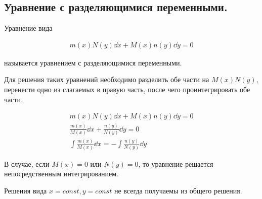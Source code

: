 \subsection{%
  Уравнение с разделяющимися переменными.%
}

\begin{definition}
  Уравнение вида

  \begin{align*}
    m(x) N(y) \dd x + M(x) n(y) \dd y = 0
  \end{align*}

  называется уравнением с разделяющимися переменными.
\end{definition}

Для решения таких уравнений необходимо разделить обе части на \(M(x) N(y)\),
перенести одно из слагаемых в правую часть, после чего проинтегрировать обе
части.

\begin{align*}
  m(x) N(y) \dd x + M(x) n(y) \dd y = 0 \\
  \frac{m(x)}{M(x)} \dd x + \frac{n(y)}{N(y)} \dd y = 0 \\
  \int \frac{m(x)}{M(x)} \dd x = - \int \frac{n(y)}{N(y)} \dd y 
\end{align*}

\begin{remark}
  В случае, если \(M(x) = 0\) или \(N(y) = 0\), то уравнение решается
  непосредственным интегрированием.
\end{remark}

\begin{remark}
  Решения вида \(x = const, y = const\) не всегда получаемы из общего решения.
\end{remark}


